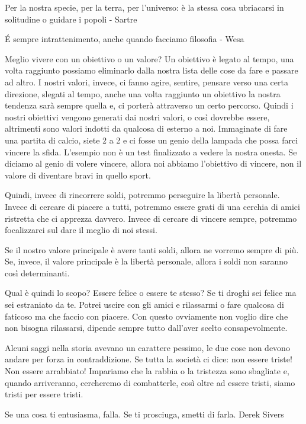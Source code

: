 \documentclass[12pt]{book} %
\begin{document}
\bigskip

Per la nostra specie, per la terra, per l'universo: è la stessa cosa ubriacarsi in solitudine o guidare i popoli - Sartre 

É sempre intrattenimento, anche quando facciamo filosofia - Wesa

\bigskip

Meglio vivere con un obiettivo o un valore?
Un obiettivo è legato al tempo, una volta raggiunto possiamo eliminarlo dalla nostra lista delle cose da fare e passare
ad altro. I nostri valori, invece, ci fanno agire, sentire, pensare verso una certa direzione, slegati al tempo, anche
una volta raggiunto un obiettivo la nostra tendenza sarà sempre quella e, ci porterà attraverso un certo percorso.
Quindi i nostri obiettivi vengono generati dai nostri valori, o così dovrebbe essere, altrimenti sono valori indotti da
qualcosa di esterno a noi. Immaginate di fare una partita di calcio, siete 2 a 2 e ci fosse un genio della lampada che
possa farci vincere la sfida. L'esempio non è un test finalizzato a vedere la nostra onesta. Se diciamo al genio di
volere vincere, allora noi abbiamo l'obiettivo di vincere, non il valore di diventare bravi in quello sport.

Quindi, invece di rincorrere soldi, potremmo perseguire la libertà personale. Invece di cercare di piacere a tutti,
potremmo essere grati di una cerchia di amici ristretta che ci apprezza davvero. 
Invece di cercare di vincere sempre, potremmo focalizzarci sul dare il meglio di noi stessi. 

Se il nostro valore principale è avere tanti soldi, allora ne vorremo sempre di più. Se, invece, il valore principale è la libertà
personale, allora i soldi non saranno così determinanti. 

Qual è quindi lo scopo? Essere felice o essere te stesso? Se ti droghi sei felice ma sei estraniato da te. Potrei uscire con gli
amici e rilassarmi o fare qualcosa di faticoso ma che faccio con piacere. Con questo ovviamente non voglio dire che non
bisogna rilassarsi, dipende sempre tutto dall'aver scelto consapevolmente.

Alcuni saggi nella storia avevano un carattere pessimo, le due cose non devono andare per forza in contraddizione. 
Se tutta la società ci dice: non essere triste! Non essere arrabbiato! Impariamo che la rabbia o la tristezza sono sbagliate e, quando arriveranno, cercheremo di combatterle, così oltre ad essere tristi, siamo tristi per essere tristi.

Se una cosa ti entusiasma, falla. Se ti prosciuga, smetti di farla.
Derek Sivers 
\end{document}

